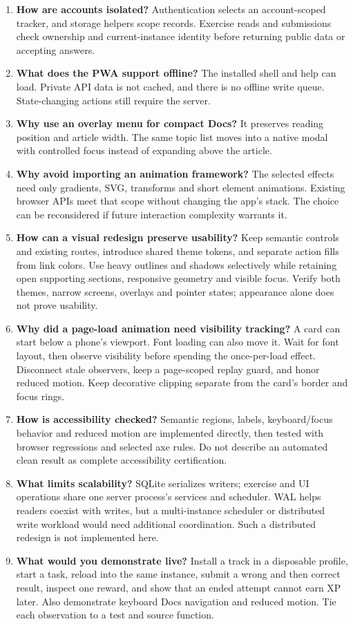 \begin{enumerate}
artifact properties. None alone proves broad professional competence.
\item \textbf{How are accounts isolated?}
Authentication selects an account-scoped tracker, and storage helpers scope records.
Exercise reads and submissions check ownership and current-instance identity before
returning public data or accepting answers.
\item \textbf{What does the PWA support offline?}
The installed shell and help can load. Private API data is not cached, and there is
no offline write queue. State-changing actions still require the server.
\item \textbf{Why use an overlay menu for compact Docs?}
It preserves reading position and article width. The same topic list moves into a
native modal with controlled focus instead of expanding above the article.
\item \textbf{Why avoid importing an animation framework?}
The selected effects need only gradients, SVG, transforms and short element
animations. Existing browser APIs meet that scope without changing the app's stack.
The choice can be reconsidered if future interaction complexity warrants it.
\item \textbf{How can a visual redesign preserve usability?}
Keep semantic controls and existing routes, introduce shared theme tokens, and
separate action fills from link colors. Use heavy outlines and shadows selectively
while retaining open supporting sections, responsive geometry and visible focus.
Verify both themes, narrow screens, overlays and pointer states; appearance alone
does not prove usability.
\item \textbf{Why did a page-load animation need visibility tracking?}
A card can start below a phone's viewport. Font loading can also move it. Wait for
font layout, then observe visibility before spending the once-per-load effect.
Disconnect stale observers, keep a page-scoped replay guard, and honor reduced
motion. Keep decorative clipping separate from the card's border and focus rings.
\item \textbf{How is accessibility checked?}
Semantic regions, labels, keyboard/focus behavior and reduced motion are implemented
directly, then tested with browser regressions and selected axe rules. Do not describe
an automated clean result as complete accessibility certification.
\item \textbf{What limits scalability?}
SQLite serializes writers; exercise and UI operations share one server process's
services and scheduler. WAL helps readers coexist with writes, but a multi-instance
scheduler or distributed write workload would need additional coordination. Such a
distributed redesign is not implemented here.
\item \textbf{What would you demonstrate live?}
Install a track in a disposable profile, start a task, reload into the same instance,
submit a wrong and then correct result, inspect one reward, and show that an ended
attempt cannot earn XP later. Also demonstrate keyboard Docs navigation and reduced
motion. Tie each observation to a test and source function.
\end{enumerate}
